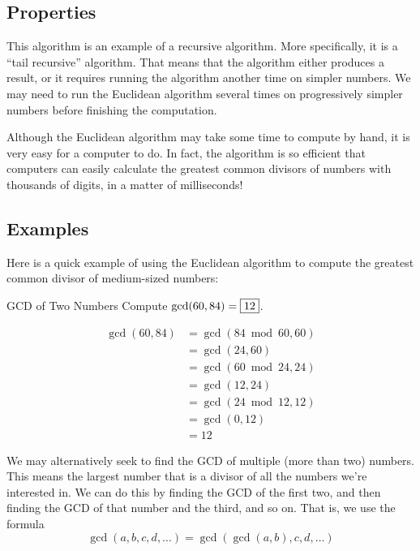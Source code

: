 \documentclass[a4paper,10pt]{report}
\begin{document}
\subsection{Properties}

This algorithm is an example of a recursive algorithm. More specifically, it is
a ``tail recursive'' algorithm. That means that the algorithm either produces a
result, or it requires running the algorithm another time on simpler numbers. We
may need to run the Euclidean algorithm several times on progressively simpler
numbers before finishing the computation.

Although the Euclidean algorithm may take some time to compute by hand, it is
very easy for a computer to do. In fact, the algorithm is so efficient that
computers can easily calculate the greatest common divisors of numbers with
thousands of digits, in a matter of milliseconds!

\subsection{Examples}

Here is a quick example of using the Euclidean algorithm to compute the
greatest common divisor of medium-sized numbers:

\begin{problem}{GCD of Two Numbers}
 Compute $\gcd(60, 84) = \Ans{12}$.

 \begin{solution}
  \begin{align*}
   \gcd(60, 84)
   &= \gcd(84 \bmod 60, 60) \\
   &= \gcd(24, 60) \\
   &= \gcd(60 \bmod 24, 24) \\
   &= \gcd(12, 24) \\
   &= \gcd(24 \bmod 12, 12) \\
   &= \gcd(0, 12) \\
   &= 12
  \end{align*}
 \end{solution}
\end{problem}

We may alternatively seek to find the GCD of multiple (more than two) numbers.
This means the largest number that is a divisor of all the numbers we're
interested in. We can do this by finding the GCD of the first two, and then
finding the GCD of that number and the third, and so on. That is, we use the
formula \[
 \gcd(a, b, c, d, \dots) = \gcd(\gcd(a, b), c, d, \dots)
\]
\end{document}
